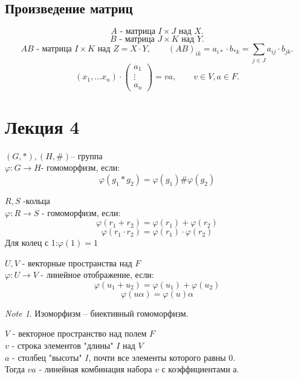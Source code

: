\documentclass[11pt]{book}
\theoremstyle{definition}
\theoremstyle{plain}
\theoremstyle{plain}
\theoremstyle{definition}
\theoremstyle{remark}
\newtheorem*{note}{Note}
\begin{document}
\subsection{Произведение матриц}
\[
    A \mbox{ - матрица } I\times J \mbox{ над } X
.\] 
\[
    B \mbox{ - матрица } J\times K \mbox{ над } Y
.\] 
\[
    AB \mbox{ - матрица } I\times K \mbox{ над } Z = X \cdot Y, \qquad (AB)_{ik} = a_{i*} \cdot b_{*k} = \sum\limits_{j\in J} a_{ij} \cdot b_{jk}
.\] 
\[
(x_1, \ldots x_n) \cdot \left ( \begin{array}{c}a_1\\ \vdots\\ a_n \end{array}\right )=va, \qquad v \in V, a \in F
.\] 
\section{Лекция 4}
\begin{defn}
$(G, *), (H, \#) $-- группа \\
$\varphi: G \to H $- гомоморфизм, если: 
$$\varphi (g_1 * g_2) = \varphi(g_1) \# \varphi(g_2)$$
\end{defn}

\begin{defn}
$R, S$ -кольца\\
$\varphi: R\to S$ - гомоморфизм, если:
$$\varphi(r_1 + r_2) = \varphi(r_1) + \varphi(r_2)$$ 
$$\varphi(r_1 \cdot r_2) = \varphi(r_1) \cdot \varphi(r_2)$$
Для колец с 1:$\varphi(1) = 1$
\end{defn}

\begin{defn}
$U, V$ - векторные пространства над $F$\\
$\varphi: U \to V$ - линейное отображение, если:
$$\varphi(u_1 + u_2) = \varphi(u_1) + \varphi(u_2)$$
$$\varphi(u \alpha) = \varphi(u) \alpha$$
\end{defn}

\begin{note}
Изоморфизм -- биективный гомоморфизм.
\end{note}

\begin{defn}
$V$ - векторное пространство над полем $F$\\
$v$ - строка элементов "длины" $I$ над $V$\\
$a$ - столбец "высоты" $I$, почти все элементы которого равны 0.\\
Тогда $va$ - линейная комбинация набора $v$ с коэффициентами $а$.\\
\end{defn}
\end{document}
